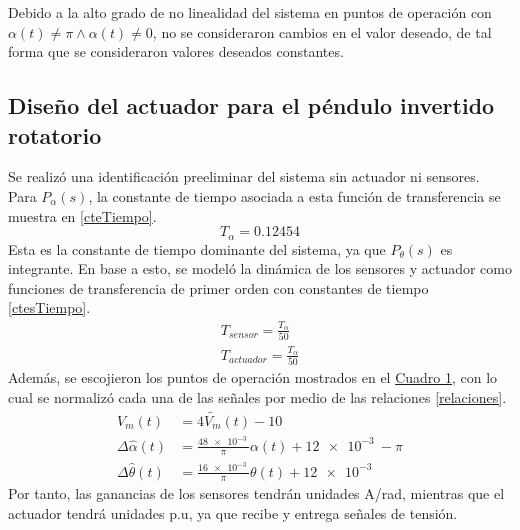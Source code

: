 Debido a la alto grado de no linealidad del sistema en puntos de operación con $\alpha(t) \neq \pi \wedge \alpha(t) \neq 0$, no se consideraron cambios en el valor deseado, de tal forma que se consideraron valores deseados constantes. 

\subsection{Diseño del actuador para el péndulo invertido rotatorio}
Se realizó una identificación preeliminar del sistema sin actuador ni sensores.
Para $P_{\alpha}(s)$, la constante de tiempo asociada a esta función de transferencia se muestra
en \eqref{cteTiempo}.
\begin{equation}
    T_{\alpha} = 0.12454 \label{cteTiempo}
\end{equation}
Esta es la constante de tiempo dominante del sistema, ya que $P_{\theta}(s)$ es integrante.
En base a esto, se modeló la dinámica de los sensores y actuador como funciones de transferencia
de primer orden con constantes de tiempo \eqref{ctesTiempo}.
\begin{equation}
    \begin{aligned}
        T_{sensor} = \frac{T_{\alpha}}{50}\label{ctesTiempo}\\
        T_{actuador} = \frac{T_{\alpha}}{50}
    \end{aligned}
\end{equation}
Además, se escojieron los puntos de operación mostrados en el \hyperref[t1]{Cuadro 1},
con lo cual se normalizó cada una de las señales por medio de las relaciones \eqref{relaciones}.
\begin{equation}
    \begin{aligned}
        V_m(t) &= 4\widetilde{V_m}(t) - 10\label{relaciones}\\
        \Delta\widehat{\alpha}(t) &= \frac{ \SI{48e-3}{}}{\pi}\alpha(t) + \SI{12e-3}{} -\pi\\
        \Delta\widehat{\theta}(t) &= \frac{ \SI{16e-3}{}}{\pi}\theta(t) + \SI{12e-3}{}
    \end{aligned}
\end{equation}
Por tanto, las ganancias de los sensores tendrán unidades A/rad, mientras que el actuador tendrá unidades p.u, ya 
que recibe y entrega señales de tensión.

